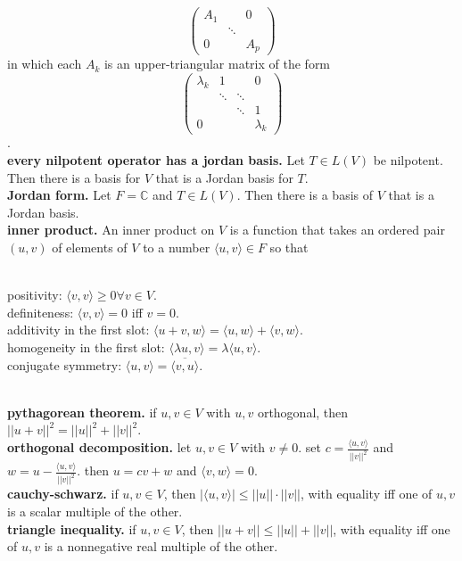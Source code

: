 	$$
	\begin{pmatrix}
	A_1 & & 0 \\
	 & \ddots & \\
	0 & & A_p
	\end{pmatrix}
	$$ in which each $A_k$ is an upper-triangular matrix of the form 
	$$
	\begin{pmatrix}
	\lambda_k & 1 & & 0 \\
	 & \ddots & \ddots & \\
	 & & \ddots & 1 \\
	0 & & & \lambda_k
	\end{pmatrix}
	$$. 
	\\ \textbf{every nilpotent operator has a jordan basis. } Let $T \in L(V)$ be nilpotent. Then there is a basis for $V$ that is a Jordan basis for $T$. 
	\\ \textbf{Jordan form. } Let $F = \mathbb{C}$ and $T \in L(V)$. Then there is a basis of $V$ that is a Jordan basis. 
	\\ \textbf{inner product. } An inner product on $V$ is a function that takes an ordered pair $(u,v)$ of elements of $V$ to a number $\langle u,v \rangle \in F$ so that 
	\begin{enumerate}
		\\ positivity: $\langle v,v \rangle \geq 0 \forall v \in V$. 
		\\ definiteness: $\langle v,v \rangle = 0$ iff $v = 0$. 
		\\ additivity in the first slot: $\langle u + v,w \rangle = \langle u,w \rangle + \langle v,w \rangle$. 
		\\ homogeneity in the first slot: $\langle \lambda u,v \rangle = \lambda \langle u,v \rangle$. 
		\\ conjugate symmetry: $\langle u,v \rangle = \overline{\langle v,u \rangle}$.
	\end{enumerate}
	\\ \textbf{pythagorean theorem. } if $u,v \in V$ with $u,v$ orthogonal, then $||u+v||^2 = ||u||^2 + ||v||^2$. 
	\\ \textbf{orthogonal decomposition. } let $u,v \in V$ with $v \neq 0$. set $c = \frac{\langle u,v \rangle}{||v||^2}$ and $w = u - \frac{\langle u,v \rangle}{||v||^2}$. then $u=cv+w$ and $\langle v,w \rangle = 0$. 
	\\ \textbf{cauchy-schwarz. } if $u,v \in V$, then $|\langle u,v \rangle| \leq ||u|| \cdot ||v||$, with equality iff one of $u,v$ is a scalar multiple of the other. 
	\\ \textbf{triangle inequality. } if $u,v \in V$, then $||u+v|| \leq ||u|| + ||v||$, with equality iff one of $u,v$ is a nonnegative real multiple of the other. 
